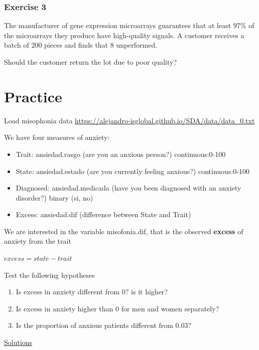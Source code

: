 \documentclass[
]{book}
\providecommand{\tightlist}{%
  \setlength{\itemsep}{0pt}\setlength{\parskip}{0pt}}
\begin{document}
\hypertarget{exercise-3-8}{%
\subsubsection{Exercise 3}\label{exercise-3-8}}

The manufacturer of gene expression microarrays guarantees that at least \(97\%\) of the microarrays they produce have high-quality signals. A customer receives a batch of \(200\) pieces and finds that \(8\) unperformed.

Should the customer return the lot due to poor quality?

\hypertarget{practice-4}{%
\section{Practice}\label{practice-4}}

Load misophonia data \url{https://alejandro-isglobal.github.io/SDA/data/data_0.txt}

We have four measures of anxiety:

\begin{itemize}
\tightlist
\item
  Trait: ansiedad.rasgo (are you an anxious person?) continuous:0-100
\item
  State: ansiedad.estado (are you currently feeling anxious?) continuous:0-100
\item
  Diagnosed: ansiedad.medicada (have you been diagnosed with an anxiety disorder?) binary (si, no)
\item
  Excess: ansiedad.dif (difference between State and Trait)
\end{itemize}

We are interested in the variable misofonia.dif, that is the observed \textbf{excess} of anxiety from the trait

\(excess = state - trait\)

Test the following hypotheses

\begin{enumerate}
\def\labelenumi{\alph{enumi}.}
\item
  Is excess in anxiety different from 0? is it higher?
\item
  Is excess in anxiety higher than 0 for men and women separately?
\item
  Is the proportion of anxious patients different from \(0.03\)?
\end{enumerate}

\href{https://colab.research.google.com/drive/13El5aoycT_6Wasvyx427TvglygiSPMpF?usp=sharing}{Solutions}
\end{document}
